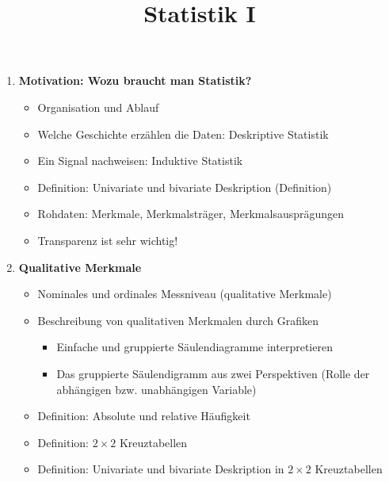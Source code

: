 \documentclass[a4paper,fontsize=12pt]{scrartcl}
\title{ Statistik I}
\date{\vspace{-10ex}}
\begin{document}
\maketitle
\begin{enumerate}
\item{\textbf{Motivation: Wozu braucht man Statistik?}
  \begin{itemize}
    \item {Organisation und Ablauf}
    \item {Welche Geschichte erzählen die Daten: Deskriptive Statistik}
    \item {Ein Signal nachweisen: Induktive Statistik}
    \item Definition: Univariate und bivariate Deskription (Definition)
    \item Rohdaten: Merkmale, Merkmalsträger, Merkmalsausprägungen
    \item {Transparenz ist sehr wichtig!}
  \end{itemize}
  }
  \item \textbf{Qualitative Merkmale}
  \begin{itemize}
     \item Nominales und ordinales Messniveau (qualitative Merkmale)
     \item {Beschreibung von qualitativen Merkmalen durch Grafiken
       \begin{itemize}
       \item{Einfache und gruppierte Säulendiagramme interpretieren}
       \item{Das gruppierte Säulendigramm aus zwei Perspektiven (Rolle der abhängigen bzw.
       unabhängigen Variable)}
       \end{itemize}
     }
     \item Definition: Absolute und relative Häufigkeit
     \item Definition: $2 \times 2$ Kreuztabellen
     \item Definition: Univariate und bivariate Deskription in $2 \times 2$ Kreuztabellen
  \end{itemize}
  
   

\end{enumerate}
\end{document}
